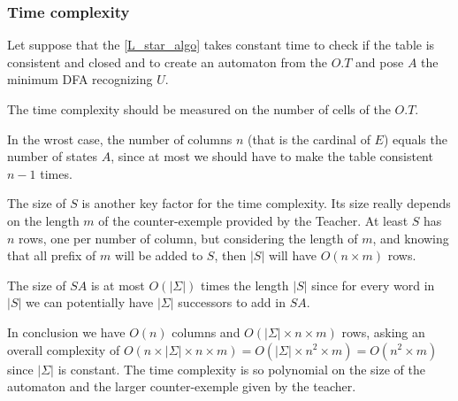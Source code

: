 \subsubsection{Time complexity}
Let suppose that the \cref{L_star_algo} takes constant time to check if the table is consistent and closed and to create an automaton from the $O.T$ and pose $A$ the minimum DFA recognizing $U$.

The time complexity should be measured on the number of cells of the $O.T$.

In the wrost case, the number of columns $n$ (that is the cardinal of $E$) equals the number of states $A$, since at most we should have to make the table consistent $n-1$ times.

The size of $S$ is another key factor for the time complexity. Its size really depends on the length $m$ of the counter-exemple provided by the Teacher. At least $S$ has $n$ rows, one per number of column, but considering the length of $m$, and knowing that all prefix of $m$ will be added to $S$, then $|S|$ will have $O(n \times m)$ rows.

The size of $SA$ is at most $O(|\Sigma|)$ times the length $|S|$ since for every word in $|S|$ we can potentially have $|\Sigma|$ successors to add in $SA$.

In conclusion we have $O(n)$ columns and $O(|\Sigma| \times n \times m)$ rows, asking an overall complexity of $O(n \times |\Sigma| \times n \times m) = O(|\Sigma| \times n^2 \times m) = O(n^2 \times m)$ since $|\Sigma|$ is constant. The time complexity is so polynomial on the size of the automaton and the larger counter-exemple given by the teacher.